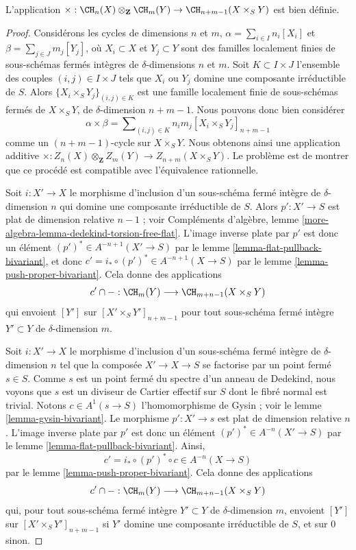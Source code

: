 \begin{lemma}
\label{lemma-exterior-product-well-defined-dim-1}
L'application $\times : \CH_n(X) \otimes_{\mathbf{Z}} \CH_m(Y) \to
\CH_{n + m - 1}(X \times_S Y)$ est bien définie.
\end{lemma}

\begin{proof}
Considérons les cycles de dimensions $n$ et $m$, $\alpha = \sum_{i \in I} n_i[X_i]$
et $\beta = \sum_{j \in J} m_j[Y_j]$, où $X_i \subset X$ et $Y_j \subset Y$
sont des familles localement finies de sous-schémas fermés intègres de
$\delta$-dimensions $n$ et $m$. Soit $K \subset I \times J$ l'ensemble
des couples $(i, j) \in I \times J$ tels que $X_i$ ou $Y_j$ domine
une composante irréductible de $S$.
Alors $\{X_i \times_S Y_j\}_{(i, j) \in K}$ est une famille localement finie
de sous-schémas fermés de $X \times_S Y$, de
$\delta$-dimension $n + m - 1$. Nous pouvons donc bien considérer
$$
\alpha \times \beta =
\sum\nolimits_{(i, j) \in K} n_i m_j [X_i \times_S Y_j]_{n + m - 1}
$$
comme un $(n + m - 1)$-cycle sur $X \times_S Y$. Nous obtenons ainsi une
application additive
$\times : Z_n(X) \otimes_{\mathbf{Z}} Z_m(Y) \to Z_{n + m}(X \times_S Y)$.
Le problème est de montrer que
ce procédé est compatible avec l'équivalence rationnelle.

\medskip\noindent
Soit $i : X' \to X$ le morphisme d'inclusion d'un sous-schéma fermé intègre
de $\delta$-dimension $n$ qui domine une composante irréductible
de $S$. Alors $p' : X' \to S$ est plat de dimension relative $n - 1$ ; voir
Compléments d'algèbre, lemme \ref{more-algebra-lemma-dedekind-torsion-free-flat}.
L'image inverse plate par $p'$ est donc un élément
$(p')^* \in A^{-n + 1}(X' \to S)$ par le
lemme \ref{lemma-flat-pullback-bivariant},
et donc $c' = i_* \circ (p')^* \in A^{-n + 1}(X \to S)$ par le
lemme \ref{lemma-push-proper-bivariant}.
Cela donne des applications
$$
c' \cap - : \CH_m(Y) \longrightarrow \CH_{m + n - 1}(X \times_S Y)
$$
qui envoient $[Y']$ sur $[X' \times_S Y']_{n + m - 1}$ pour tout
sous-schéma fermé intègre $Y' \subset Y$ de $\delta$-dimension $m$.

\medskip\noindent
Soit $i : X' \to X$ le morphisme d'inclusion d'un sous-schéma fermé intègre
de $\delta$-dimension $n$ tel que la composée $X' \to X \to S$ 
se factorise par un point fermé $s \in S$. Comme $s$ est un point fermé
du spectre d'un anneau de Dedekind, nous voyons que $s$ est un diviseur de
Cartier effectif sur $S$ dont le fibré normal est trivial. Notons
$c \in A^1(s \to S)$ l'homomorphisme de Gysin ; voir le
lemme \ref{lemma-gysin-bivariant}. Le morphisme $p' : X' \to s$
est plat de dimension relative $n$. L'image inverse plate par $p'$
est donc un élément $(p')^* \in A^{-n}(X' \to S)$ par le
lemme \ref{lemma-flat-pullback-bivariant}.
Ainsi,
$$
c' = i_* \circ (p')^* \circ c \in A^{-n}(X \to S)
$$
par le lemme \ref{lemma-push-proper-bivariant}. Cela donne des applications
$$
c' \cap - : \CH_m(Y) \longrightarrow \CH_{m + n - 1}(X \times_S Y)
$$
qui, pour tout sous-schéma fermé intègre $Y' \subset Y$
de $\delta$-dimension $m$,
envoient $[Y']$ sur $[X' \times_S Y']_{n + m - 1}$ si $Y'$ domine
une composante irréductible de $S$, et sur $0$ sinon.


\end{proof}
